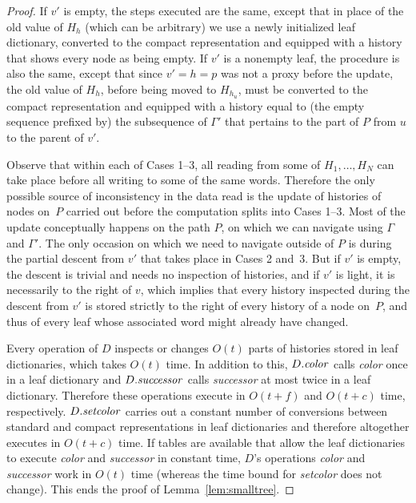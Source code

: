 \documentclass[envcountsame,envcountsect,undated,nolinenumbers]{lnthi}
\def\Tvn#1{\hbox{\textit{#1\/}}}
\begin{document}
\begin{proof}
If $v'$ is empty, the steps executed are the same,
except that in place of the old value of $H_h$
(which can be arbitrary) we use a newly initialized
leaf dictionary, converted to the compact representation
and equipped with a history that shows every node
as being empty.
If $v'$ is a nonempty leaf, the procedure is also the same, except that
since $v'=h=p$ was not a proxy before the update, the old value of $H_h$,
before being moved to $H_{h_u}$, must be converted
to the compact representation and equipped
with a history equal to (the empty sequence prefixed by)
the subsequence of $\Gamma'$ that pertains to
the part of $P$ from $u$ to the parent of $v'$.

Observe that within each of Cases 1--3, all reading
from some of $H_1,\ldots,H_N$ can take place before
all writing to some of the same words.
Therefore the only possible source of inconsistency
in the data read
is the update of histories of nodes on~$P$
carried out before the computation
splits into Cases 1--3.
Most of the update conceptually happens on the
path $P$, on which we can navigate using
$\Gamma$ and $\Gamma'$.
The only occasion on which we need to navigate
outside of $P$ is during the partial descent
from $v'$ that takes place in Cases 2 and~3.
But if $v'$ is empty, the descent is trivial
and needs no inspection of histories, and if
$v'$ is light, it is necessarily to the
right of $v$, which implies that every history
inspected during the descent from $v'$ is stored
strictly to the right of every history of a
node on~$P$, and thus of every leaf
whose associated word might already have changed.

\medskip

Every operation of $D$ inspects or changes
$O(t)$ parts of histories stored in leaf
dictionaries, which takes $O(t)$ time.
In addition to this, $D.\Tvn{color}$
calls \Tvn{color} once in a leaf dictionary
and $D.\Tvn{successor}$ calls \Tvn{successor}
at most twice in a leaf dictionary.
Therefore these operations execute in $O(t+f)$
and $O(t+c)$ time, respectively.
$D.\Tvn{setcolor}$ carries out a constant number
of conversions between standard and
compact representations in
leaf dictionaries and therefore
altogether executes in $O(t+c)$ time.
If tables are available that allow the
leaf dictionaries to execute \Tvn{color}
and \Tvn{successor} in constant time,
$D$'s operations \Tvn{color} and \Tvn{successor}
work in $O(t)$ time (whereas the
time bound for \Tvn{setcolor} does not change).
This ends the proof of Lemma~\ref{lem:smalltree}.
\end{proof}
\end{document}
